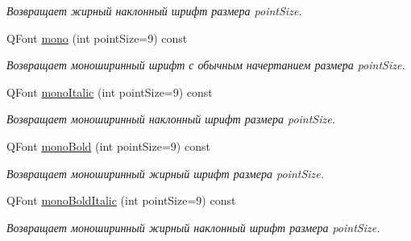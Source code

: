 \begin{DoxyCompactItemize}
\begin{DoxyCompactList}\small\item\em Возвращает жирный наклонный шрифт размера point\+Size. \end{DoxyCompactList}\item 
Q\+Font \hyperlink{class_font_manager_a19660b1113a41b0931060a03f3278511}{mono} (int point\+Size=9) const \hypertarget{class_font_manager_a19660b1113a41b0931060a03f3278511}{}\label{class_font_manager_a19660b1113a41b0931060a03f3278511}

\begin{DoxyCompactList}\small\item\em Возвращает моноширинный шрифт с обычным начертанием размера point\+Size. \end{DoxyCompactList}\item 
Q\+Font \hyperlink{class_font_manager_ad5832ecd81dd74aa1ef3d977b354c201}{mono\+Italic} (int point\+Size=9) const \hypertarget{class_font_manager_ad5832ecd81dd74aa1ef3d977b354c201}{}\label{class_font_manager_ad5832ecd81dd74aa1ef3d977b354c201}

\begin{DoxyCompactList}\small\item\em Возвращает моноширинный наклонный шрифт размера point\+Size. \end{DoxyCompactList}\item 
Q\+Font \hyperlink{class_font_manager_a237e20413e333888bf419f7a53fce254}{mono\+Bold} (int point\+Size=9) const \hypertarget{class_font_manager_a237e20413e333888bf419f7a53fce254}{}\label{class_font_manager_a237e20413e333888bf419f7a53fce254}

\begin{DoxyCompactList}\small\item\em Возвращает моноширинный жирный шрифт размера point\+Size. \end{DoxyCompactList}\item 
Q\+Font \hyperlink{class_font_manager_acfe06fd0a388c24129a4e63e9d7fdc53}{mono\+Bold\+Italic} (int point\+Size=9) const \hypertarget{class_font_manager_acfe06fd0a388c24129a4e63e9d7fdc53}{}\label{class_font_manager_acfe06fd0a388c24129a4e63e9d7fdc53}

\begin{DoxyCompactList}\small\item\em Возвращает моноширинный жирный наклонный шрифт размера point\+Size. \end{DoxyCompactList}\end{DoxyCompactItemize}
